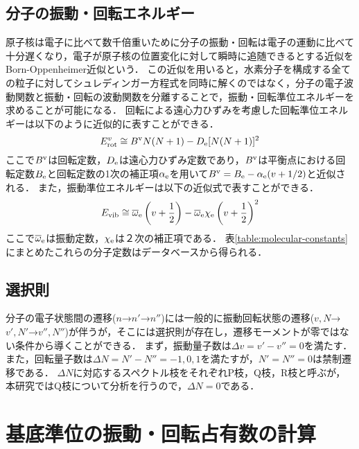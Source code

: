\subsection{分子の振動・回転エネルギー}
原子核は電子に比べて数千倍重いために分子の振動・回転は電子の運動に比べて十分遅くなり，電子が原子核の位置変化に対して瞬時に追随できるとする近似をBorn-Oppenheimer近似という\cite{bunsibunko-no-kiso}．
この近似を用いると，水素分子を構成する全ての粒子に対してシュレディンガー方程式を同時に解くのではなく，分子の電子波動関数と振動・回転の波動関数を分離することで，振動・回転準位エネルギーを求めることが可能になる．
回転による遠心力ひずみを考慮した回転準位エネルギーは以下のように近似的に表すことができる\cite{bunsibunko-no-kiso}．
\begin{equation}
    E^v_{\rm rot} \cong B^{\rm v} N (N+1) - D_{\rm e} [N(N+1)]^2
\end{equation}
ここで$B^{\rm v}$は回転定数，$D_{\rm e}$は遠心力ひずみ定数であり，$B^{\rm v}$は平衡点における回転定数$B_{\rm e}$と回転定数の1次の補正項$\alpha_{\rm e}$を用いて$B^{\rm v}=B_{\rm e} - \alpha_{\rm e} (v + 1/2)$と近似される\cite{bunsibunko-no-kiso}．
また，振動準位エネルギーは以下の近似式で表すことができる\cite{bunsibunko-no-kiso}．
\begin{equation}
    E_{\rm vib} \cong \overline{\omega}_{\rm e} \left(v + \frac{1}{2} \right) - \overline{\omega}_{\rm e} \chi_{\rm e} \left(v + \frac{1}{2} \right)^2
\end{equation}
ここで$\overline{\omega}_{\rm e}$は振動定数，$\chi_{\rm e}$は２次の補正項である．
表\ref{table:molecular-constants}にまとめたこれらの分子定数はデータベースから得られる\cite{nist}．

\subsection{選択則}
分子の電子状態間の遷移($n$→$n'$→$n''$)には一般的に振動回転状態の遷移($v,N$→$v',N'$→$v'',N''$)が伴うが，そこには選択則が存在し，遷移モーメントが零ではない条件から導くことができる\cite{bunsibunko-no-kiso}．
まず，振動量子数は$\Delta v = v'-v'' = 0$を満たす．
また，回転量子数は$\Delta N = N' - N'' = -1,0,1$を満たすが，$N'=N''=0$は禁制遷移である．
$\Delta N$に対応するスペクトル枝をそれぞれP枝，Q枝，R枝と呼ぶが，本研究ではQ枝について分析を行うので，$\Delta N = 0$である．

\section{基底準位の振動・回転占有数の計算}
